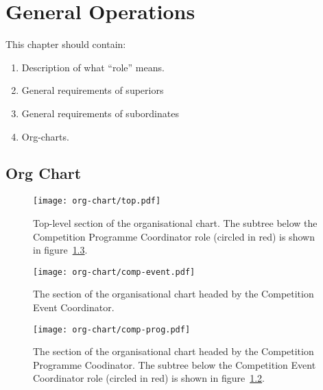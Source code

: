 \chapter{General Operations}

This chapter should contain:
\begin{enumerate}
\item Description of what ``role'' means.
\item General requirements of superiors
\item General requirements of subordinates
\item Org-charts.
\end{enumerate}

\section{Org Chart}

\begin{landscape}
  \begin{figure}
    \begin{center}
      \texttt{[image: org-chart/top.pdf]}
    \end{center}
    \caption{\label{fig:org-chart-top}Top-level section of the organisational chart.  The subtree below the Competition Programme Coordinator role (circled in red) is shown in figure~\ref{fig:org-chart-prog}.}
  \end{figure}
\end{landscape}

\begin{landscape}
  \begin{figure}
    \begin{center}
      \texttt{[image: org-chart/comp-event.pdf]}
    \end{center}
    \caption{\label{fig:org-chart-event}The section of the organisational chart headed by the Competition Event Coordinator.}
  \end{figure}
\end{landscape}

\begin{landscape}
  \begin{figure}
    \begin{center}
      \texttt{[image: org-chart/comp-prog.pdf]}
    \end{center}
    \caption{\label{fig:org-chart-prog}The section of the organisational chart headed by the Competition Programme Coodinator.  The subtree below the Competition Event Coordinator role (circled in red) is shown in figure~\ref{fig:org-chart-event}.}
  \end{figure}
\end{landscape}

